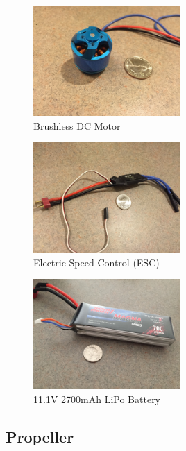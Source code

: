 \begin{figure}
    \centering
    \includegraphics[width=0.5\textwidth]{graphics/motor.jpg}
    \caption{Brushless DC Motor}
    \label{fig:motor}
\end{figure}

\begin{figure}
    \centering
    \includegraphics[width=0.5\textwidth]{graphics/esc.jpg}
    \caption{Electric Speed Control (ESC)}
    \label{fig:esc}
  \end{figure}
  
\begin{figure}
    \centering
    \includegraphics[width=0.5\textwidth]{graphics/battery.jpg}
    \caption{11.1V 2700mAh LiPo Battery}
    \label{fig:battery}
 \end{figure}
 
\subsection{Propeller}

